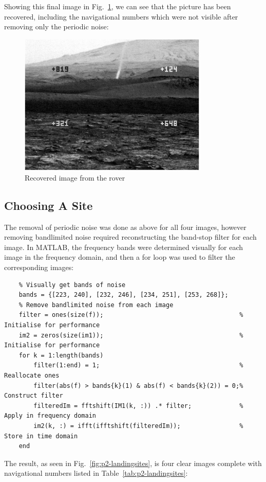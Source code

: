 \documentclass[12pt]{article}
\numberwithin{equation}{section}
\numberwithin{figure}{section}
\numberwithin{table}{section}
\begin{document}
Showing this final image in Fig.~\ref{fig:p2-im1recov}, we can see that the
picture has been recovered, including the navigational numbers which were not
visible after removing only the periodic noise:

\begin{figure}[ht]
    \centering
    \includegraphics[width=9cm]{figures/p2-im1recov.png}
    \caption{Recovered image from the rover\label{fig:p2-im1recov}}
\end{figure}

\pagebreak
\subsection{Choosing A Site}
The removal of periodic noise was done as above for all four images, however
removing bandlimited noise required reconstructing the band-stop filter for
each image. In MATLAB, the frequency bands were determined visually for each
image in the frequency domain, and then a for loop was used to filter the
corresponding images:
\begin{verbatim}
    % Visually get bands of noise
    bands = {[223, 240], [232, 246], [234, 251], [253, 268]};
    % Remove bandlimited noise from each image
    filter = ones(size(f));                                     % Initialise for performance
    im2 = zeros(size(im1));                                     % Initialise for performance
    for k = 1:length(bands)
        filter(1:end) = 1;                                      % Reallocate ones
        filter(abs(f) > bands{k}(1) & abs(f) < bands{k}(2)) = 0;% Construct filter
        filteredIm = fftshift(IM1(k, :)) .* filter;             % Apply in frequency domain
        im2(k, :) = ifft(ifftshift(filteredIm));                % Store in time domain
    end
\end{verbatim}

The result, as seen in Fig.~\ref{fig:p2-landingsites}, is four clear images
complete with navigational numbers listed in Table~\ref{tab:p2-landingsites}:
\end{document}

